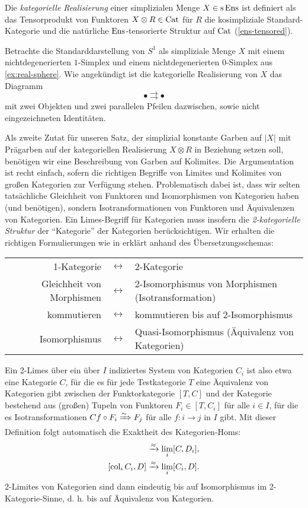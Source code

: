 \begin{defn}
  Die \emph{kategorielle Realisierung} einer simplizialen Menge $X \in
  \operatorname{s}\operatorname{Ens}$ ist definiert als das Tensorprodukt von Funktoren $X \otimes
  R \in \operatorname{Cat}$ für $R$ die kosimpliziale Standard-Kategorie und die
  natürliche $\operatorname{Ens}$-tensorierte Struktur auf $\operatorname{Cat}$
  (\ref{ens-tensored}).
\end{defn}
\begin{bsp}
  Betrachte die Standarddarstellung von $S^1$ als simpliziale Menge
  $X$ mit einem nichtdegenerierten $1$-Simplex und einem
  nichtdegenerierten $0$-Simplex aus \ref{ex:real-sphere}. Wie
  angekündigt ist die kategorielle Realisierung von $X$ das Diagramm
  \[ \bullet \rightrightarrows \bullet \]
  mit zwei Objekten und zwei parallelen Pfeilen dazwischen, sowie
  nicht eingezeichneten Identitäten.
\end{bsp}

Als zweite Zutat für unseren Satz, der simplizial konstante Garben auf
$|X|$ mit Prägarben auf der kategoriellen Realisierung $X \otimes R$
in Beziehung setzen soll, benötigen wir eine Beschreibung von Garben
auf Kolimites. Die Argumentation ist recht einfach, sofern die
richtigen Begriffe von Limites und Kolimites von großen Kategorien zur
Verfügung stehen. Problematisch dabei ist, dass wir selten
tatsächliche Gleichheit von Funktoren und Isomorphismen von Kategorien
haben (und benötigen), sondern Isotransformationen von Funktoren und
Äquivalenzen von Kategorien. Ein Limes-Begriff für Kategorien muss
insofern die \emph{2-kategorielle Struktur} der ``Kategorie'' der
Kategorien berücksichtigen. Wir erhalten die richtigen Formulierungen
wie in \cite{nlab:2-limit} erklärt anhand des Übersetzungsschemas:
\renewcommand{\arraystretch}{1.5}
\begin{center}
    \begin{tabulary}{\textwidth}{RCL}
    1-Kategorie & $\leftrightarrow$
    & 2-Kategorie \\
    Gleichheit von Morphismen & $\leftrightarrow$
    & 2-Isomorphismus von Morphismen (Isotransformation) \\
    kommutieren & $\leftrightarrow$
    & kommutieren bis auf 2-Isomorphismus \\
    Isomorphismus & $\leftrightarrow$
    & Quasi-Isomorphismus (Äquivalenz von Kategorien)  
  \end{tabulary}
\end{center}
Ein 2-Limes über ein über $I$ indiziertes System von Kategorien $C_i$
ist also etwa eine Kategorie $C$, für die es für jede Testkategorie
$T$ eine Äquivalenz von Kategorien gibt zwischen der Funktorkategorie
$[T, C]$ und der Kategorie bestehend aus (großen) Tupeln von Funktoren
$F_i \in [T, C_i]$ für alle $i \in I$, für die es Isotransformationen
$Cf \circ F_i \xRightarrow{\sim} F_j$ für alle $f: i \to j$ in $I$ gibt. Mit
dieser Definition folgt automatisch die Exaktheit des Kategorien-Homs:
\begin{align*}
  [C, \lim_i D_i] &\qiso \lim_i [C, D_i], \\
  [\col_i C_i, D] &\qiso \lim_i [C_i, D].
\end{align*}
2-Limites von Kategorien sind dann eindeutig bis auf Isomorphismus im
2-Kategorie-Sinne, d. h. bis auf Äquivalenz von Kategorien.

